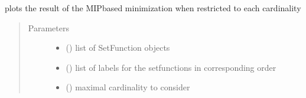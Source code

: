 \documentclass[letterpaper,10pt,english]{sphinxmanual}
\begin{document}
\begin{fulllineitems}
\label{\detokenize{setFTs:setFTs.plotting.plot_min_mip}}
\sphinxAtStartPar
plots the result of the MIP\sphinxhyphen{}based minimization when restricted to each cardinality
\begin{quote}\begin{description}
\item[{Parameters}] \leavevmode\begin{itemize}
\item {} 
\sphinxAtStartPar
{} (\sphinxstyleliteralemphasis{\sphinxupquote{{[}}}\sphinxstyleliteralemphasis{\sphinxupquote{{]}}}) \textendash{} list of SetFunction objects

\item {} 
\sphinxAtStartPar
{} (\sphinxstyleliteralemphasis{\sphinxupquote{{[}}}\sphinxstyleliteralemphasis{\sphinxupquote{{]}}}) \textendash{} list of labels for the setfunctions in corresponding order

\item {} 
\sphinxAtStartPar
{} () \textendash{} maximal cardinality to consider

\end{itemize}

\end{description}\end{quote}

\end{fulllineitems}

\end{document}
